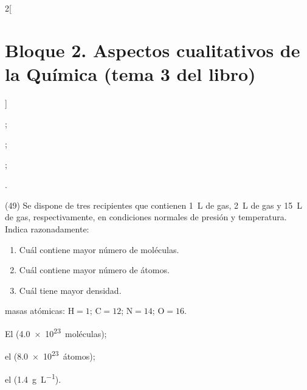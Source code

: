 \documentclass[10pt]{article}
\newenvironment{gexdatos}{
  \noindent\makebox[0pt][r]{\textit{Datos:}}
  }{\vspace{5pt}}
\begin{document}
\begin{multicols}{2}[
    \section{Bloque 2. Aspectos cualitativos de la Química (tema 3 del libro)}
  ]
\begin{solution}
  \begin{enumerate*}
    \item {};
    \item {};
    \item {};
    \item {}.
  \end{enumerate*}
\end{solution}





\begin{exercise}[
    tags    = {},
    topics  = {química,química básica},
    source  = {FQ 1B MGH 2016, p85, e26},
  ]

  (49) Se dispone de tres recipientes que contienen \SI{1}{\liter} de  gas, \SI{2}{\liter} de  gas y \SI{15}{\liter} de  gas, respectivamente, en condiciones normales de presión y temperatura. Indica razonadamente:

  \begin{enumerate}
    \item Cuál contiene mayor número de moléculas.
    \item Cuál contiene mayor número de átomos.
    \item Cuál tiene mayor densidad.
  \end{enumerate}

  \begin{gexdatos}
    masas atómicas: \( \textrm{H} = 1 \); \( \textrm{C} = 12 \); \( \textrm{N} = 14 \); \( \textrm{O} = 16 \).
  \end{gexdatos}
\end{exercise}

\begin{solution}
  \begin{enumerate*}
    \item El  (\SI{4.0e23}{moléculas});
    \item el  (\SI{8.0e23}{átomos});
    \item el  (\SI{1.4}{\gram\per\liter}).
  \end{enumerate*}
\end{solution}





\begin{exercise}[
    tags    = {},
    topics  = {química,química básica},
    source  = {FQ 1B MGH 2016, p85, e26},
  ]


\end{exercise}
\end{multicols}
\end{document}
